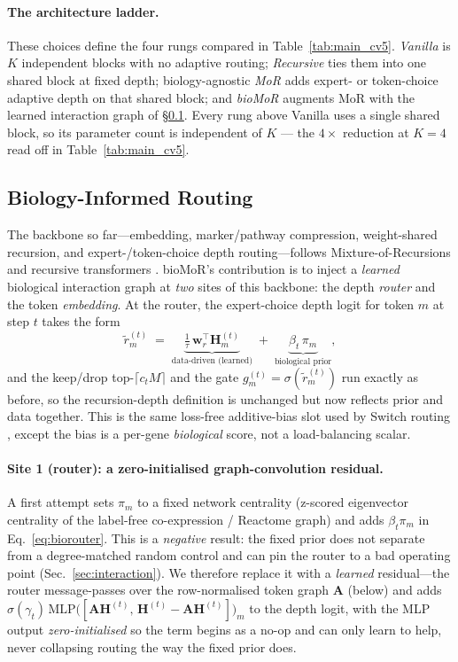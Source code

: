 \documentclass[letterpaper]{article}
\begin{document}
\paragraph{The architecture ladder.}
These choices define the four rungs compared in Table~\ref{tab:main_cv5}. \emph{Vanilla} is $K$
independent blocks with no adaptive routing; \emph{Recursive} ties them into one shared block at
fixed depth; biology-agnostic \emph{MoR} adds expert- or token-choice adaptive depth on that
shared block; and \emph{bioMoR} augments MoR with the learned interaction graph of
\S\ref{sec:biorouter}. Every rung above Vanilla uses a single shared block, so its parameter count
is independent of $K$ --- the $4\times$ reduction at $K{=}4$ read off in Table~\ref{tab:main_cv5}.

\subsection{Biology-Informed Routing}
\label{sec:biorouter}
The backbone so far---embedding, marker/pathway compression, weight-shared recursion, and
expert-/token-choice depth routing---follows Mixture-of-Recursions and recursive transformers
\cite{bae2025mixture,dehghani2019universal,lan2020albert}. bioMoR's contribution is to inject
a \emph{learned} biological interaction graph at \emph{two} sites of this backbone: the depth
\emph{router} and the token \emph{embedding}. At the router, the expert-choice depth logit for
token $m$ at step $t$ takes the form
\begin{equation}
\tilde r^{(t)}_m \;=\; \underbrace{\tfrac{1}{\tau}\,\mathbf{w}_r^{\top}\mathbf{H}^{(t)}_m}_{\text{data-driven (learned)}}
\;+\; \underbrace{\beta_t\,\pi_m}_{\text{biological prior}},
\label{eq:biorouter}
\end{equation}
and the keep/drop top-$\lceil c_t M\rceil$ and the gate
$g^{(t)}_m=\sigma(\tilde r^{(t)}_m)$ run exactly as before, so the recursion-depth
definition is unchanged but now reflects prior and data together. This is the same
loss-free additive-bias slot used by Switch routing \cite{shazeer2017outrageously},
except the bias is a per-gene \emph{biological} score, not a load-balancing scalar.

\paragraph{Site 1 (router): a zero-initialised graph-convolution residual.}
A first attempt sets $\pi_m$ to a fixed network centrality (z-scored eigenvector centrality
of the label-free co-expression / Reactome graph) and adds $\beta_t\pi_m$ in
Eq.~\ref{eq:biorouter}. This is a \emph{negative} result: the fixed prior does not separate
from a degree-matched random control and can pin the router to a bad operating point
(Sec.~\ref{sec:interaction}). We therefore replace it with a \emph{learned} residual---the
router message-passes over the row-normalised token graph $\mathbf{A}$ (below) and adds
$\sigma(\gamma_t)\,\mathrm{MLP}\big([\mathbf{A}\mathbf{H}^{(t)},\,\mathbf{H}^{(t)}-\mathbf{A}\mathbf{H}^{(t)}]\big)_m$
to the depth logit, with the MLP output \emph{zero-initialised} so the term begins as a
no-op and can only learn to help, never collapsing routing the way the fixed prior does.
\end{document}
